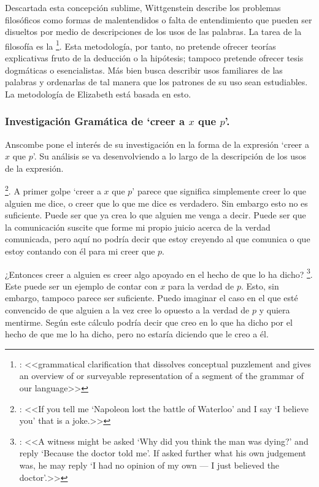Descartada esta concepción sublime, Wittgenstein describe los problemas
filosóficos como formas de malentendidos o falta de entendimiento que pueden ser
disueltos por medio de descripciones de los usos de las palabras. La tarea de la
filosofía es la \footnote{\cite[12]{bakerhacker2009understanding}: <<grammatical
  clarification that dissolves conceptual puzzlement and gives an overview of or
  surveyable representation of a segment of the grammar of our language>>}. Esta
metodología, por tanto, no pretende ofrecer teorías explicativas fruto de la
deducción o la hipótesis; tampoco pretende ofrecer tesis dogmáticas o
esencialistas. Más bien busca describir usos familiares de las palabras y
ordenarlas de tal manera que los patrones de su uso sean
estudiables\autocite[Cf.~][12]{bakerhacker2009understanding}. La metodología de
Elizabeth está basada en esto.

\subsubsection{Investigación Gramática de `creer a $x$ que $p$'.}
Anscombe pone el interés de su investigación en la forma de la expresión `creer
a $x$ que $p$'\autocite[Cf.~][2]{anscombe2008faith:tobelieve}. Su análisis se va
desenvolviendo a lo largo de la descripción de los usos de la expresión.

\footnote{\cite[4]{anscombe2008faith:tobelieve}: <<If you tell me
  `Napoleon lost the battle of Waterloo' and I say `I believe you' that is a
  joke.>>}. A primer golpe `creer a $x$ que $p$' parece que significa
simplemente creer lo que alguien me dice, o creer que lo que me dice es
verdadero. Sin embargo esto no es suficiente. Puede ser que ya crea lo que
alguien me venga a decir. Puede ser que la comunicación suscite que forme mi
propio juicio acerca de la verdad comunicada, pero aquí no podría decir que
estoy creyendo al que comunica o que estoy contando con él para mi creer que
$p$.

¿Entonces creer a alguien es creer algo apoyado en el hecho de que lo ha dicho?
\footnote{\cite[4]{anscombe2008faith:tobelieve}: <<A witness might be
  asked `Why did you think the man was dying?' and reply `Because the doctor
  told me'. If asked further what his own judgement was, he may reply `I had no
  opinion of my own --- I just believed the doctor'.>>}. Este puede ser un
ejemplo de contar con $x$ para la verdad de $p$. Esto, sin embargo, tampoco
parece ser suficiente. Puedo imaginar el caso en el que esté convencido de que
alguien a la vez cree lo opuesto a la verdad de $p$ y quiera mentirme. Según
este cálculo podría decir que creo en lo que ha dicho por el hecho de que me lo
ha dicho, pero no estaría diciendo que le creo a él.

